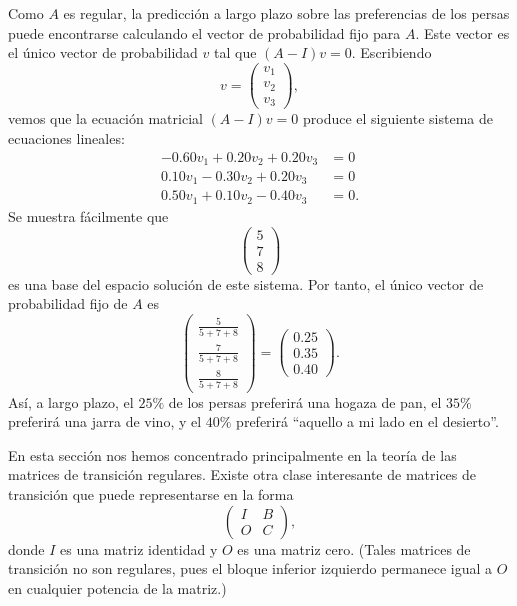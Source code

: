 \documentclass[12pt,a4paper]{book}
\begin{document}
\begin{ejemplo}
        Como $A$ es regular, la predicción a largo plazo sobre las preferencias de los persas puede encontrarse calculando el vector de probabilidad fijo para $A$. Este vector es el único vector de probabilidad $v$ tal que $(A-I)v=0$. Escribiendo
        \begin{equation*}
            v=\begin{pmatrix}v_1\\v_2\\v_3\end{pmatrix},
        \end{equation*}
        vemos que la ecuación matricial $(A-I)v=0$ produce el siguiente sistema de ecuaciones lineales:
        \begin{align*}
            -0.60v_1+0.20v_2+0.20v_3&=0\\
            0.10v_1-0.30v_2+0.20v_3&=0\\
            0.50v_1+0.10v_2-0.40v_3&=0.
        \end{align*}
        Se muestra fácilmente que
        \begin{equation*}
            \begin{pmatrix}5\\7\\8\end{pmatrix}
        \end{equation*}
        es una base del espacio solución de este sistema. Por tanto, el único vector de probabilidad fijo de $A$ es
        \begin{equation*}
            \begin{pmatrix}\frac{5}{5+7+8}\\[0.5ex]\frac{7}{5+7+8}\\[0.5ex]\frac{8}{5+7+8}\end{pmatrix}=\begin{pmatrix}0.25\\0.35\\0.40\end{pmatrix}.
        \end{equation*}
        Así, a largo plazo, el $25\%$ de los persas preferirá una hogaza de pan, el $35\%$ preferirá una jarra de vino, y el $40\%$ preferirá \textquotedblleft aquello a mi lado en el desierto\textquotedblright.
    \end{ejemplo}

    En esta sección nos hemos concentrado principalmente en la teoría de las matrices de transición regulares. Existe otra clase interesante de matrices de transición que puede representarse en la forma
    \begin{equation*}
        \begin{pmatrix}I&B\\O&C\end{pmatrix},
    \end{equation*}
    donde $I$ es una matriz identidad y $O$ es una matriz cero. (Tales matrices de transición no son regulares, pues el bloque inferior izquierdo permanece igual a $O$ en cualquier potencia de la matriz.)
\end{document}
